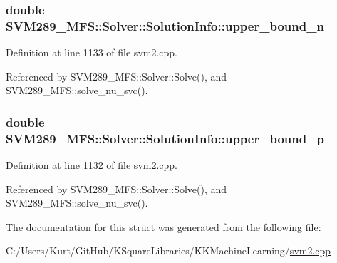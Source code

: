\subsubsection[{\texorpdfstring{upper\+\_\+bound\+\_\+n}{upper_bound_n}}]{\setlength{\rightskip}{0pt plus 5cm}double S\+V\+M289\+\_\+\+M\+F\+S\+::\+Solver\+::\+Solution\+Info\+::upper\+\_\+bound\+\_\+n}\hypertarget{struct_s_v_m289___m_f_s_1_1_solver_1_1_solution_info_a2545a536d0eb0d1d2dc04a1402257f82}{}\label{struct_s_v_m289___m_f_s_1_1_solver_1_1_solution_info_a2545a536d0eb0d1d2dc04a1402257f82}


Definition at line 1133 of file svm2.\+cpp.



Referenced by S\+V\+M289\+\_\+\+M\+F\+S\+::\+Solver\+::\+Solve(), and S\+V\+M289\+\_\+\+M\+F\+S\+::solve\+\_\+nu\+\_\+svc().

\subsubsection[{\texorpdfstring{upper\+\_\+bound\+\_\+p}{upper_bound_p}}]{\setlength{\rightskip}{0pt plus 5cm}double S\+V\+M289\+\_\+\+M\+F\+S\+::\+Solver\+::\+Solution\+Info\+::upper\+\_\+bound\+\_\+p}\hypertarget{struct_s_v_m289___m_f_s_1_1_solver_1_1_solution_info_a3bd42ac9799f94148cb7b2efeffd6590}{}\label{struct_s_v_m289___m_f_s_1_1_solver_1_1_solution_info_a3bd42ac9799f94148cb7b2efeffd6590}


Definition at line 1132 of file svm2.\+cpp.



Referenced by S\+V\+M289\+\_\+\+M\+F\+S\+::\+Solver\+::\+Solve(), and S\+V\+M289\+\_\+\+M\+F\+S\+::solve\+\_\+nu\+\_\+svc().



The documentation for this struct was generated from the following file\+:\begin{DoxyCompactItemize}
\item 
C\+:/\+Users/\+Kurt/\+Git\+Hub/\+K\+Square\+Libraries/\+K\+K\+Machine\+Learning/\hyperlink{svm2_8cpp}{svm2.\+cpp}\end{DoxyCompactItemize}
